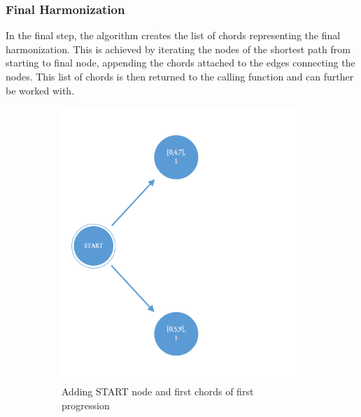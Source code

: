 
\subsubsection{Final Harmonization}
In the final step, the algorithm creates the list of chords representing the final harmonization. This is achieved by iterating the nodes of the shortest path from starting to final node, appending the chords attached to the edges connecting the nodes. This list of chords is then returned to the calling function and can further be worked with.

\begin{figure}[!tbp]
\vspace*{-3cm}
\centering
\begin{subfigure}[b]{0.43\linewidth}
   \includegraphics[width=\linewidth]{Chapters/pic/41}
   \caption{Adding START node and first chords of first progression}
   \label{fig:41} 
\end{subfigure}
\hfill
\begin{subfigure}[b]{0.49\linewidth}

\end{subfigure}
\end{figure}
